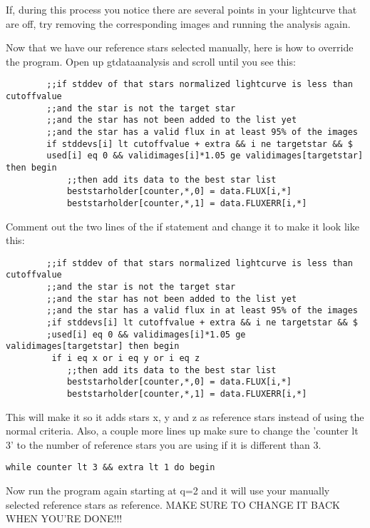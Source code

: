 \documentclass[10pt,preprint]{aastex}
\begin{document}
If, during this process you notice there are several points in your lightcurve that are off, try removing the corresponding images and running the analysis again.

Now that we have our reference stars selected manually, here is how to override the program. Open up gtdataanalysis and scroll until you see this:

\begin{verbatim}
        ;;if stddev of that stars normalized lightcurve is less than cutoffvalue
        ;;and the star is not the target star
        ;;and the star has not been added to the list yet
        ;;and the star has a valid flux in at least 95% of the images 
        if stddevs[i] lt cutoffvalue + extra && i ne targetstar && $
        used[i] eq 0 && validimages[i]*1.05 ge validimages[targetstar] then begin
            ;;then add its data to the best star list
            beststarholder[counter,*,0] = data.FLUX[i,*]
            beststarholder[counter,*,1] = data.FLUXERR[i,*]
\end{verbatim}

Comment out the two lines of the if statement and change it to make it look like this:

\begin{verbatim}
        ;;if stddev of that stars normalized lightcurve is less than cutoffvalue
        ;;and the star is not the target star
        ;;and the star has not been added to the list yet
        ;;and the star has a valid flux in at least 95% of the images 
        ;if stddevs[i] lt cutoffvalue + extra && i ne targetstar && $
        ;used[i] eq 0 && validimages[i]*1.05 ge validimages[targetstar] then begin
         if i eq x or i eq y or i eq z
            ;;then add its data to the best star list
            beststarholder[counter,*,0] = data.FLUX[i,*]
            beststarholder[counter,*,1] = data.FLUXERR[i,*]
\end{verbatim}

This will make it so it adds stars x, y and z as reference stars instead of using the normal criteria. Also, a couple more lines up make sure to change the 'counter lt 3' to the number of reference stars you are using if it is different than 3.

\begin{verbatim}
while counter lt 3 && extra lt 1 do begin
\end{verbatim}

Now run the program again starting at q=2 and it will use your manually selected reference stars as reference. MAKE SURE TO CHANGE IT BACK WHEN YOU'RE DONE!!!
\end{document}
